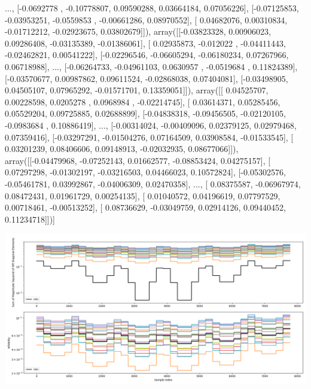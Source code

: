 \documentclass{article}
\begin{document}
       ...,
       [-0.0692778 , -0.10778807,  0.09590288,  0.03664184,  0.07056226],
       [-0.07125853, -0.03953251, -0.0559853 , -0.00661286,  0.08970552],
       [ 0.04682076,  0.00310834, -0.01712212, -0.02923675,  0.03802679]]), array([[-0.03823328,  0.00906023,  0.09286408, -0.03135389, -0.01386061],
       [ 0.02935873, -0.012022  , -0.04411443, -0.02462821,  0.00541222],
       [-0.02296546, -0.06605294, -0.06180234,  0.07267966,  0.06718988],
       ...,
       [-0.06264733, -0.04961103,  0.0630957 , -0.0519684 ,  0.11824389],
       [-0.03570677,  0.00987862,  0.09611524, -0.02868038,  0.07404081],
       [-0.03498905,  0.04505107,  0.07965292, -0.01571701,  0.13359051]]), array([[ 0.04525707,  0.00228598,  0.0205278 ,  0.0968984 , -0.02214745],
       [ 0.03614371,  0.05285456,  0.05529204,  0.09725885,  0.02688899],
       [-0.04838318, -0.09456505, -0.02120105, -0.0983684 ,  0.10886419],
       ...,
       [-0.00314024, -0.00409096,  0.02379125,  0.02979468,  0.07359416],
       [-0.03297291, -0.01504276,  0.07164509,  0.03908584, -0.01533545],
       [ 0.03201239,  0.08406606,  0.09148913, -0.02032935,  0.08677066]]), array([[-0.04479968, -0.07252143,  0.01662577, -0.08853424,  0.04275157],
       [ 0.07297298, -0.01302197, -0.03216503,  0.04466023,  0.10572824],
       [-0.05302576, -0.05461781,  0.03992867, -0.04006309,  0.02470358],
       ...,
       [ 0.08375587, -0.06967974,  0.08472431,  0.01961729,  0.00254135],
       [ 0.01040572,  0.04196619,  0.07797529,  0.00718461, -0.00513252],
       [ 0.08736629, -0.03049759,  0.02914126,  0.09440452,  0.11234718]])]
\begin{center}
\includegraphics[scale=.9]{report_pickled_controls261/control_dpn_all.png}

\end{center}
\end{document}
